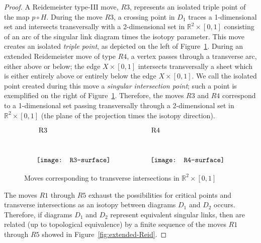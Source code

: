 \documentclass{amsart}\usepackage{amsfonts, amsmath, amssymb}\usepackage{graphicx, epic, epsf, enumerate, stmaryrd}
\theoremstyle{definition}
\numberwithin{equation}{section}
\begin{document}
\begin{proof}
A Reidemeister type-III move, $R3$, represents an isolated triple point of the map $p \circ H$. During the move $R3$, a crossing point in $D_1$ traces a 1-dimensional set and intersects transversally with a 2-dimensional set in $\mathbb{R}^2 \times[0,1]$ consisting of an arc of the singular link diagram times the isotopy parameter. This move creates an isolated \textit {triple point}, as depicted on the left of Figure~\ref{fig:triple point}. During an extended Reidemeister move of type $R4$, a vertex passes through a transverse arc, either above or below; the edge $X \times [0,1]$ intersects transversally a sheet which is either entirely above or entirely below the edge $X \times [0,1]$. We call the isolated point created during this move a \textit{singular intersection point};  such a point is exemplified on the right of Figure~\ref{fig:triple point}. Therefore, the moves $R3$ and $R4$ correspond to a 1-dimensional set passing transversally through a 2-dimensional set in $\mathbb{R}^2 \times[0,1]$ (the plane of the projection times the isotopy direction). 
\begin{figure}[ht]
\[ \raisebox{5pt}{\texttt{[image: R3-surface]}}
 \put(-102, 47){\fontsize{6}{6}R3}
 \hspace{2cm}
  \raisebox{5pt}{\texttt{[image: R4-surface]}}  \put(-104, 47){\fontsize{6}{6}R4}
\]
\caption{Moves corresponding to transverse intersections in $\mathbb{R}^2 \times [0,1]$} \label{fig:triple point}
\end{figure}

The moves $R1$ through $R5$ exhaust the possibilities for critical points and transverse intersections as an isotopy between diagrams $D_1$ and $D_2$ occurs. Therefore, if diagrams $D_1$ and $D_2$ represent equivalent singular links, then are related (up to topological equivalence) by a finite sequence of the moves $R1$ through $R5$ showed in Figure~\ref{fig:extended-Reid}.
\end{proof}
\end{document}
